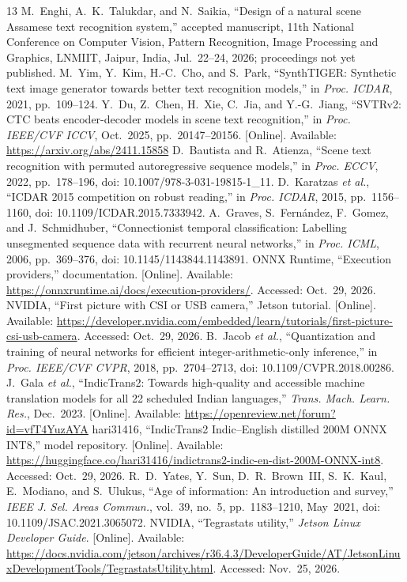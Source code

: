 \documentclass[cspaper,journal,10pt]{IEEEtran}
\begin{document}
\begin{thebibliography}{13}
 M.~Enghi, A.~K.~Talukdar, and N.~Saikia, ``Design of a natural scene Assamese text recognition system,'' accepted manuscript, 11th National Conference on Computer Vision, Pattern Recognition, Image Processing and Graphics, LNMIIT, Jaipur, India, Jul.~22--24, 2026; proceedings not yet published.
 M.~Yim, Y.~Kim, H.-C.~Cho, and S.~Park, ``SynthTIGER: Synthetic text image generator towards better text recognition models,'' in \emph{Proc. ICDAR}, 2021, pp.~109--124.
 Y.~Du, Z.~Chen, H.~Xie, C.~Jia, and Y.-G.~Jiang, ``SVTRv2: CTC beats encoder-decoder models in scene text recognition,'' in \emph{Proc. IEEE/CVF ICCV}, Oct.~2025, pp.~20147--20156. [Online]. Available: \url{https://arxiv.org/abs/2411.15858}
 D.~Bautista and R.~Atienza, ``Scene text recognition with permuted autoregressive sequence models,'' in \emph{Proc. ECCV}, 2022, pp.~178--196, doi: 10.1007/978-3-031-19815-1\_11.
 D.~Karatzas \emph{et al.}, ``ICDAR 2015 competition on robust reading,'' in \emph{Proc. ICDAR}, 2015, pp.~1156--1160, doi: 10.1109/ICDAR.2015.7333942.
 A.~Graves, S.~Fern\'andez, F.~Gomez, and J.~Schmidhuber, ``Connectionist temporal classification: Labelling unsegmented sequence data with recurrent neural networks,'' in \emph{Proc. ICML}, 2006, pp.~369--376, doi: 10.1145/1143844.1143891.
 ONNX Runtime, ``Execution providers,'' documentation. [Online]. Available: \url{https://onnxruntime.ai/docs/execution-providers/}. Accessed: Oct.~29, 2026.
 NVIDIA, ``First picture with CSI or USB camera,'' Jetson tutorial. [Online]. Available: \url{https://developer.nvidia.com/embedded/learn/tutorials/first-picture-csi-usb-camera}. Accessed: Oct.~29, 2026.
 B.~Jacob \emph{et al.}, ``Quantization and training of neural networks for efficient integer-arithmetic-only inference,'' in \emph{Proc. IEEE/CVF CVPR}, 2018, pp.~2704--2713, doi: 10.1109/CVPR.2018.00286.
 J.~Gala \emph{et al.}, ``IndicTrans2: Towards high-quality and accessible machine translation models for all 22 scheduled Indian languages,'' \emph{Trans. Mach. Learn. Res.}, Dec.~2023. [Online]. Available: \url{https://openreview.net/forum?id=vfT4YuzAYA}
 hari31416, ``IndicTrans2 Indic--English distilled 200M ONNX INT8,'' model repository. [Online]. Available: \url{https://huggingface.co/hari31416/indictrans2-indic-en-dist-200M-ONNX-int8}. Accessed: Oct.~29, 2026.
 R.~D.~Yates, Y.~Sun, D.~R.~Brown~III, S.~K.~Kaul, E.~Modiano, and S.~Ulukus, ``Age of information: An introduction and survey,'' \emph{IEEE J. Sel. Areas Commun.}, vol.~39, no.~5, pp.~1183--1210, May~2021, doi: 10.1109/JSAC.2021.3065072.
 NVIDIA, ``Tegrastats utility,'' \emph{Jetson Linux Developer Guide}. [Online]. Available: \url{https://docs.nvidia.com/jetson/archives/r36.4.3/DeveloperGuide/AT/JetsonLinuxDevelopmentTools/TegrastatsUtility.html}. Accessed: Nov.~25, 2026.
\end{thebibliography}
\end{document}
